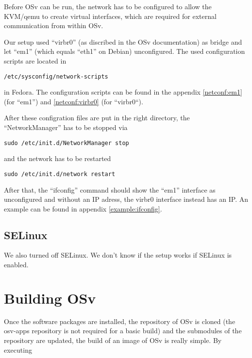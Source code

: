         Before OSv can be run, the network has to be configured to allow the
        KVM/qemu to create virtual interfaces, which are required for external
        communication from within OSv.

        Our setup used ``virbr0'' (as discribed in the OSv documentation) as
        bridge and let ``em1'' (which equals ``eth1'' on Debian) unconfigured.
        The used configuration scripts are located in

\begin{lstlisting}
/etc/sysconfig/network-scripts
\end{lstlisting}

        in Fedora. The configuration scripts can be found in the appendix
        \ref{netconf:em1} (for ``em1'') and \ref{netconf:virbr0} (for
        ``virbr0``).

        After these configration files are put in the right directory, the
        ``NetworkManager'' has to be stopped via

\begin{lstlisting}
sudo /etc/init.d/NetworkManager stop
\end{lstlisting}

        and the network has to be restarted

\begin{lstlisting}
sudo /etc/init.d/network restart
\end{lstlisting}

        After that, the ``ifconfig'' command should show the ``em1'' interface
        as unconfigured and without an IP adress, the virbr0 interface instead
        has an IP. An example can be found in appendix \ref{example:ifconfig}.


    \section{SELinux}

        We also turned off SELinux. We don't know if the setup works if SELinux
        is enabled.

\chapter{Building OSv}

    Once the software packages are installed, the repository of OSv is
    cloned (the osv-apps repository is not required for a basic build) and
    the submodules of the repository are updated, the build of an image of
    OSv is really simple. By executing

